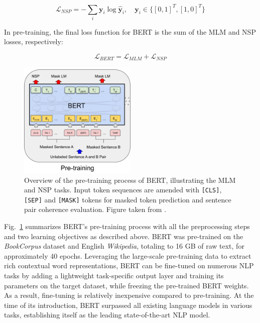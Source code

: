 \begin{equation}
    \mathcal{L}_{NSP} = -\sum_{i} \bm{y}_i \log \bm{\hat{y}}_i, \quad \bm{y}_i \in \{[0, 1]^T, [1, 0]^T\}
\end{equation}

In pre-training, the final loss function for BERT is the sum of the MLM and NSP
losses, respectively:

\begin{equation}
    \mathcal{L}_{BERT} = \mathcal{L}_{MLM} + \mathcal{L}_{NSP}
\end{equation}

\begin{figure}[htb]
    \centering
    \includegraphics[width=0.5\textwidth]{figures/bert}
    \caption[Overview of the pre-training process of BERT]{Overview of the
    pre-training process of BERT, illustrating the MLM and NSP tasks. Input
    token sequences are amended with \texttt{[CLS]}, \texttt{[SEP]} and
    \texttt{[MASK]} tokens for masked token prediction and sentence pair
    coherence evaluation. Figure taken from \cite{devlin2019bert}.}
    \label{fig:bert}
\end{figure}

Fig.~\ref{fig:bert} summarizes BERT's pre-training process with all the
preprocessing steps and two learning objectives as described above. BERT was
pre-trained on the \textit{BookCorpus} \cite{zhu2015aligning} dataset and
English \textit{Wikipedia}, totaling to 16 GB of raw text, for approximately 40
epochs. Leveraging the large-scale pre-training data to extract rich contextual
word representations, BERT can be fine-tuned on numerous NLP tasks by adding
a lightweight task-specific output layer and training its parameters on the
target dataset, while freezing the pre-trained BERT weights. As a result,
fine-tuning is relatively inexpensive compared to pre-training. At the time of
its introduction, BERT surpassed all existing language models in various tasks,
establishing itself as the leading state-of-the-art NLP model.

